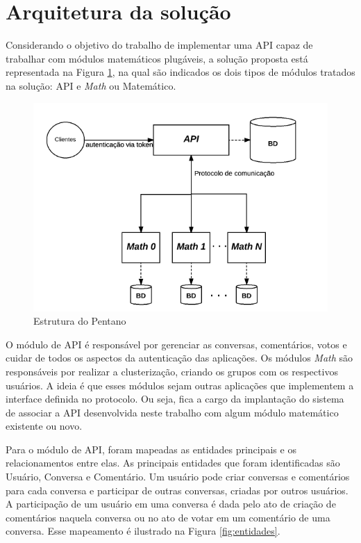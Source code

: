 \section{Arquitetura da solução}

Considerando o objetivo do trabalho de implementar uma API capaz de trabalhar com 
módulos matemáticos plugáveis, a solução proposta está representada na Figura \ref{fig:pentano}, 
na qual são indicados os dois tipos de módulos tratados na solução: API e \textit{Math} ou Matemático.
 
\begin{figure}[h!]
\centering
\includegraphics[scale=0.7]{figuras/esquema_pentano.png}
\caption{Estrutura do Pentano}
\label{fig:pentano}
\end{figure}

O módulo de API é responsável por gerenciar as conversas, comentários, votos
e cuidar de todos os aspectos da autenticação das aplicações. Os módulos \textit{Math} são responsáveis por realizar
a clusterização, criando os grupos com os respectivos usuários. 
A ideia é que esses módulos sejam outras aplicações que implementem a interface definida no protocolo. Ou seja, 
fica a cargo da implantação do sistema de associar a API desenvolvida neste trabalho com algum módulo matemático 
existente ou novo.

Para o módulo de API, foram mapeadas as entidades principais e os relacionamentos entre elas. 
As principais entidades que foram identificadas são Usuário, Conversa e Comentário. Um usuário pode criar
conversas e comentários para cada conversa e participar de outras conversas, criadas por outros usuários.
A participação de um usuário em uma conversa é dada pelo ato de criação de comentários naquela conversa ou
no ato de votar em um comentário de uma conversa. Esse mapeamento é ilustrado na Figura \ref{fig:entidades}.

